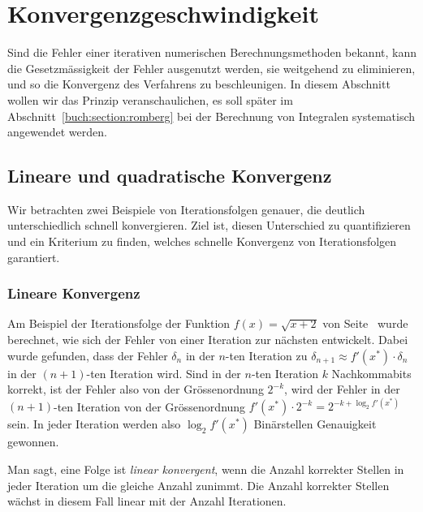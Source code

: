 %
%
%
\section{Konvergenzgeschwindigkeit
\label{buch:section:geschwindigkeit}}
%
Sind die Fehler einer iterativen numerischen Berechnungsmethoden
bekannt, kann die Gesetzmässigkeit der Fehler ausgenutzt werden,
sie weitgehend zu eliminieren, und so die Konvergenz des Verfahrens
zu beschleunigen.
%
%
In diesem Abschnitt wollen wir das Prinzip veranschaulichen, es
soll später im Abschnitt~\ref{buch:section:romberg}
bei der Berechnung von Integralen systematisch angewendet werden.

%
%
\subsection{Lineare und quadratische Konvergenz
\label{buch:subsection:linearekonvergenz}}
Wir betrachten zwei Beispiele von Iterationsfolgen genauer, die
deutlich unterschiedlich schnell konvergieren.
Ziel ist, diesen Unterschied zu quantifizieren und ein Kriterium
zu finden, welches schnelle Konvergenz von Iterationsfolgen garantiert.

\subsubsection{Lineare Konvergenz}
%
%
Am Beispiel der Iterationsfolge der Funktion $f(x)=\sqrt{x+2}$
von Seite~\pageref{section:beispiel:sqrtiteration}
wurde berechnet, wie sich der Fehler von einer Iteration zur nächsten
entwickelt.
Dabei wurde gefunden, dass der Fehler $\delta_n$ in der $n$-ten Iteration
zu $\delta_{n+1}\approx f'(x^*)\cdot\delta_n$ in der $(n+1)$-ten Iteration
wird.
Sind in der $n$-ten Iteration $k$ Nachkommabits korrekt, ist der Fehler
also von der Grössenordnung $2^{-k}$, wird der Fehler in der $(n+1)$-ten
Iteration von der Grössenordnung $f'(x^*) \cdot 2^{-k}= 2^{-k+\log_2f'(x^*)}$
sein.
In jeder Iteration werden also $\log_2f'(x^*)$ Binärstellen Genauigkeit
gewonnen.

Man sagt, eine Folge ist {\em linear konvergent}, wenn die Anzahl
korrekter Stellen in jeder Iteration um die gleiche Anzahl zunimmt.
%
%
Die Anzahl korrekter Stellen wächst in diesem Fall linear mit der
Anzahl Iterationen.

